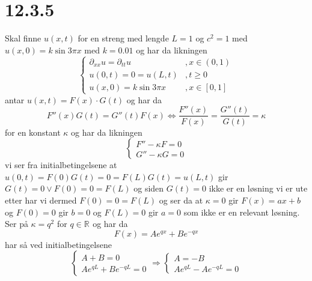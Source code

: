 \documentclass{report}
\newcommand{\M}[2]{\mathbb{#1}^{#2}}
\newcommand{\bbrack}[1]{\left[ #1 \right]}
\begin{document}
\section*{12.3.5}
Skal finne $u(x, t)$ for en streng med lengde $L=1$ og $c^{2} = 1$ med $u(x, 0) = k \sin 3\pi x$ med $k = 0.01$ og har da likningen
\begin{equation}
  \label{eq:5}
  \left\lbrace
    \begin{array}{ll}
      \partial_{xx} u = \partial_{tt} u &, x \in (0, 1) \\
      u(0, t) = 0 = u(L, t) &, t \geq 0\\
      u(x, 0) = k \sin 3\pi x &, x \in \bbrack{ 0, 1 }
    \end{array} \right.
\end{equation}
antar $u(x, t) = F(x) \cdot G(t)$ og har da
\begin{equation}
  \label{eq:6}
  F''(x) G(t) = G''(t) F(x) \Leftrightarrow \frac{F''(x)}{F(x)} = \frac{G''(t)}{G(t)} = \kappa
\end{equation}
for en konstant $\kappa$ og har da likningen
\begin{equation}
  \label{eq:7}
  \left\lbrace
    \begin{array}{l}
      F'' - \kappa F = 0 \\
      G'' - \kappa G = 0
    \end{array}
  \right.
\end{equation}
vi ser fra initialbetingelsene at $u(0, t) = F(0)G(t) = 0 = F(L)G(t) = u(L, t)$ gir $G(t) = 0 \lor F(0) = 0 = F(L)$ og siden $G(t) = 0$ ikke er en løsning vi er ute etter har vi dermed $F(0) = 0 = F(L)$ og ser da at $\kappa = 0$ gir $F(x) = ax + b$ og $F(0) = 0$ gir $b=0$ og $F(L) = 0$ gir $a=0$ som ikke er en relevant løsning. Ser på $\kappa = q^{2}$ for $q \in \M{R}{}$ og har da
\begin{equation}
  \label{eq:9}
  F(x) = Ae^{qx} + Be^{-qx}
\end{equation}
har så ved initialbetingelsene
\begin{equation}
  \label{eq:10}
  \left\lbrace
    \begin{array}{l}
      A + B = 0 \\
      Ae^{qL} + Be^{-qL} = 0
    \end{array}
  \right. \Rightarrow \left\lbrace
    \begin{array}{l}
      A = -B \\
      Ae^{qL} - Ae^{-qL} = 0
    \end{array}
  \right.
\end{equation}
\end{document}
